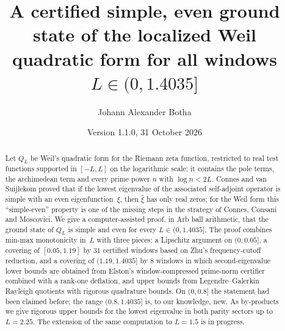 \documentclass[11pt]{amsart}
\newcommand{\Lmax}{1.4035}                                %
\theoremstyle{definition}
\theoremstyle{remark}
\numberwithin{equation}{section}
\begin{document}
\title[Simple, even ground state of the localized Weil form]{A certified simple, even ground state of the localized Weil quadratic form for all windows $L\in(0,\Lmax]$}

\author{Johann Alexander Botha}
\address{GenusCore}

\date{Version 1.1.0, 31 October 2026}


\begin{abstract}
Let $Q_L$ be Weil's quadratic form for the Riemann zeta function, restricted to real test functions supported in $[-L,L]$ on the logarithmic scale; it contains the pole terms, the archimedean term and every prime power $n$ with $\log n<2L$. Connes and van Suijlekom proved that if the lowest eigenvalue of the associated self-adjoint operator is simple with an even eigenfunction~$\xi$, then $\hat\xi$ has only real zeros; for the Weil form this ``simple-even'' property is one of the missing steps in the strategy of Connes, Consani and Moscovici. We give a computer-assisted proof, in Arb ball arithmetic, that the ground state of $Q_L$ is simple and even for every $L\in(0,\Lmax]$. The proof combines min-max monotonicity in~$L$ with three pieces: a Lipschitz argument on $(0,0.05]$, a covering of $[0.05,1.19]$ by $31$ certified windows based on Zhu's frequency-cutoff reduction, and a covering of $(1.19,\Lmax]$ by $8$ windows in which second-eigenvalue lower bounds are obtained from Elston's window-compressed prime-norm certifier combined with a rank-one deflation, and upper bounds from Legendre--Galerkin Rayleigh quotients with rigorous quadrature bounds. On $(0,0.8]$ the statement had been claimed before; the range $(0.8,\Lmax]$ is, to our knowledge, new. As by-products we give rigorous upper bounds for the lowest eigenvalue in both parity sectors up to $L=2.25$.
The extension of the same computation to $L=1.5$ is in progress.
\end{abstract}

\maketitle

\setcounter{tocdepth}{1}
\tableofcontents

\end{document}
